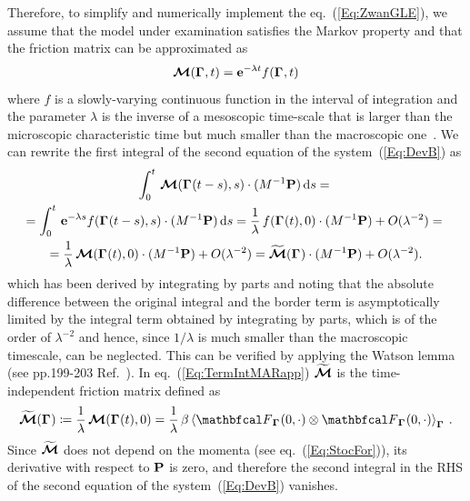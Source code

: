 \documentclass[10pt,a4paper]{book}
\theoremstyle{definition}
\begin{document}
Therefore, to simplify and numerically implement the eq.~(\ref{Eq:ZwanGLE}), we assume that the model under examination satisfies the Markov property and that the friction matrix can be approximated as
\begin{equation*}
  \boldsymbol{\mathcal{M}}(\boldsymbol\Gamma_{},t) = \mathbf{e}^{-\lambda t}f(\boldsymbol\Gamma_{},t)
\end{equation*}
where $f$ is a slowly-varying continuous function in the interval of integration and the parameter $\lambda$ is the inverse of a mesoscopic time-scale that is larger than the microscopic characteristic time but much smaller than the macroscopic one~\cite{Berne:DynamicLightScatt,Hijon2010}. 
We can rewrite the first integral of the second equation of the system~(\ref{Eq:DevB}) as
\begin{multline}
\label{Eq:TermIntMARapp}
  \int_0^t\, \boldsymbol{\mathcal{M}}(\boldsymbol\Gamma_{}(t-s),s) \cdot(M^{-1}\mathbf{P}) \,\mbox{d} s ={}\\
   = \int_0^t\, \mathbf{e}^{-\lambda s}f(\boldsymbol\Gamma_{}(t-s),s) \cdot(M^{-1}\mathbf{P}) \,\mbox{d} s = \frac{1}{\lambda}\, f(\boldsymbol\Gamma_{}(t),0) \cdot (M^{-1}\mathbf{P}) 
   + O(\lambda^{-2}) ={}\\ 
   = \frac{1}{\lambda}\, \boldsymbol{\mathcal{M}}(\boldsymbol\Gamma_{}(t),0) \cdot (M^{-1}\mathbf{P}) + O(\lambda^{-2}) 
   =  \widetilde{\boldsymbol{\mathcal{M}}}(\boldsymbol\Gamma_{}) \cdot (M^{-1}\mathbf{P}) + O(\lambda^{-2}).
\end{multline}
which has been derived by integrating by parts and noting that the absolute difference between the original integral and the border term is asymptotically limited by the integral term obtained by integrating by parts, which is of the order of $\lambda^{-2}$ and hence, since $1 / \lambda$ is much smaller than the macroscopic timescale, can be neglected. This can be verified by applying the Watson lemma (see pp.199-203 Ref.~\cite{bernardini1993Metodi}). In eq.~(\ref{Eq:TermIntMARapp}) $\widetilde{\boldsymbol{\mathcal{M}}}$ is the time-independent friction matrix defined as	
\begin{equation}\label{Eq:MarDeltaFric}
  \widetilde{\bffricmat}(\Bphase{}) \coloneqq \frac{1}{\lambda}\,\bffricmat(\Bphase{}(t),0)
  = \frac{1}{\lambda}\, \beta\aver{\fprojbf_{\Bphase{}}(0,\cdot)\otimes
    \fprojbf_{\Bphase{}}(0,\cdot)}_{\Bphase{}}\,.
\end{equation}
Since $\widetilde{\boldsymbol{\mathcal{M}}}$ does not depend on the momenta (see eq.~(\ref{Eq:StocFor})), its derivative with respect to ${\bf P}$ is zero, and therefore the second integral in the RHS of the second equation of the system~(\ref{Eq:DevB}) vanishes.
\end{document}
